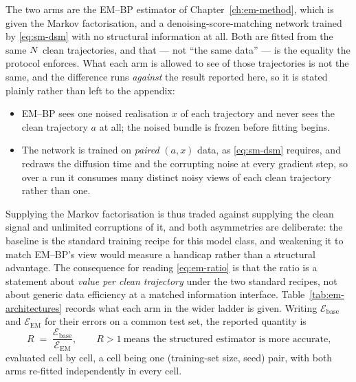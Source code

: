 The two arms are the EM--BP estimator of Chapter~\ref{ch:em-method}, which is
given the Markov factorisation, and a denoising-score-matching network trained
by \eqref{eq:sm-dsm} with no structural information at all. Both are fitted
from the same $N$ clean trajectories, and that --- not ``the same data''
--- is the equality the protocol enforces. What each arm is allowed to see of
those trajectories is not the same, and the difference runs \emph{against} the
result reported here, so it is stated plainly rather than left to the
appendix:

\begin{itemize}
  \item EM--BP sees one noised realisation $x$ of each trajectory and never
  sees the clean trajectory $a$ at all; the noised bundle is frozen before
  fitting begins.
  \item The network is trained on \emph{paired} $(a, x)$ data, as
  \eqref{eq:sm-dsm} requires, and redraws the diffusion time and the
  corrupting noise at every gradient step, so over a run it consumes many
  distinct noisy views of each clean trajectory rather than one.
\end{itemize}

\noindent
Supplying the Markov factorisation is thus traded against supplying the clean
signal and unlimited corruptions of it, and both asymmetries are deliberate:
the baseline is the standard training recipe for this model class, and
weakening it to match EM--BP's view would measure a handicap rather than a
structural advantage. The consequence for reading
\eqref{eq:em-ratio} is that the ratio is a statement about
\emph{value per clean trajectory} under the two standard recipes, not about
generic data efficiency at a matched information interface.
Table~\ref{tab:em-architectures} records what each arm in the wider ladder is
given.
Writing $\mathcal{E}_{\mathrm{base}}$ and $\mathcal{E}_{\mathrm{EM}}$ for
their errors on a common test set, the reported quantity is
\begin{equation}
  R \;=\; \frac{\mathcal{E}_{\mathrm{base}}}{\mathcal{E}_{\mathrm{EM}}},
  \qquad R > 1 \ \text{means the structured estimator is more accurate,}
  \label{eq:em-ratio}
\end{equation}
evaluated cell by cell, a cell being one (training-set size, seed) pair, with
both arms re-fitted independently in every cell.

